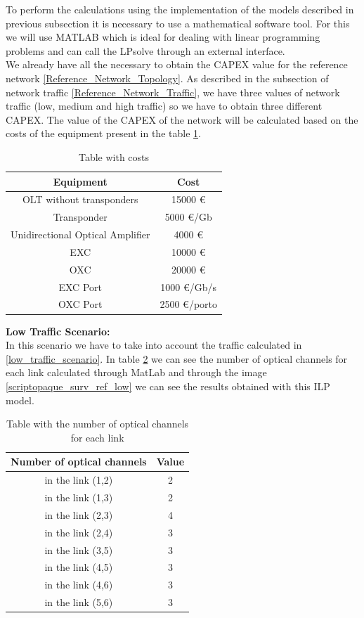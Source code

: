 To perform the calculations using the implementation of the models described in previous subsection it is necessary to use a mathematical software tool. For this we will use MATLAB which is ideal for dealing with linear programming problems and can call the LPsolve through an external interface. \\
We already have all the necessary to obtain the CAPEX value for the reference network \ref{Reference_Network_Topology}. As described in the subsection of network traffic \ref{Reference_Network_Traffic}, we have three values of network traffic (low, medium and high traffic) so we have to obtain three different CAPEX.
The value of the CAPEX of the network will be calculated based on the costs of the equipment present in the table \ref{table_cost2_ilp}.\\

\begin{table}[h!]
\centering
\begin{tabular}{|| c | c||}
 \hline
 Equipment & Cost \\
 \hline\hline
 OLT without transponders & 15000 \euro \\
 Transponder & 5000 \euro/Gb \\
 Unidirectional Optical Amplifier & 4000 \euro \\
 EXC & 10000 \euro \\
 OXC & 20000 \euro \\
 EXC Port & 1000 \euro /Gb/s\\
 OXC Port & 2500 \euro /porto \\
 \hline
\end{tabular}
\caption{Table with costs}
\label{table_cost2_ilp}
\end{table}


\textbf{Low Traffic Scenario:}\\

In this scenario we have to take into account the traffic calculated in \ref{low_traffic_scenario}. In table \ref{result_ILP1P_reference} we can see the number of optical channels for each link calculated through MatLab and through the image \ref{scriptopaque_surv_ref_low} we can see the results obtained with this ILP model.\\

\begin{table}[h!]
\centering
\begin{tabular}{|| c | c||}
 \hline
 Number of optical channels & Value \\
 \hline\hline
 in the link (1,2) & 2 \\
 in the link (1,3) & 2 \\
 in the link (2,3) & 4 \\
 in the link (2,4) & 3 \\
 in the link (3,5) & 3 \\
 in the link (4,5) & 3 \\
 in the link (4,6) & 3 \\
 in the link (5,6) & 3 \\
 \hline
\end{tabular}
\caption{Table with the number of optical channels for each link}
\label{result_ILP1P_reference}
\end{table}
\newpage


